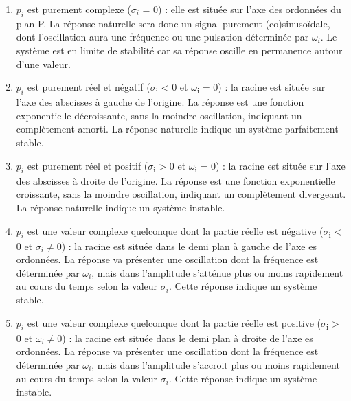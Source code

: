 \documentclass[]{book}
\begin{document}
{	
	\begin{enumerate}
		\item $p_{i}$ est purement complexe ($\sigma_{i}$ = 0) : elle est située sur l'axe des ordonnées du plan P. La réponse  naturelle sera donc un signal purement (co)sinusoïdale, dont l'oscillation aura une fréquence ou une pulsation déterminée par $\omega_{i}$. Le système est en limite de stabilité car sa réponse oscille en permanence autour d'une valeur.
		\item $p_{i}$ est purement réel et négatif ($ \sigma $\textsubscript{i} \textless{} 0 et 		$ \omega $\textsubscript{i} = 0) : la racine est située sur l'axe des abscisses à 		gauche de l'origine. La réponse est une fonction exponentielle 		décroissante, sans la moindre oscillation, indiquant un complètement 		amorti. La réponse naturelle indique un système parfaitement stable.
		\item $p_{i}$ est purement réel et positif ($ \sigma $\textsubscript{i} \textgreater{} 0 et $ \omega $\textsubscript{i} = 0) : la racine est située sur l'axe des abscisses à droite de l'origine. La réponse est une fonction exponentielle croissante, sans la moindre oscillation, indiquant un complètement divergeant. La réponse naturelle indique un système instable.
		\item $p_{i}$ est une valeur complexe quelconque dont la partie réelle est négative ($ \sigma $\textsubscript{i} \textless{} 0 et  $ \sigma_{i} \neq 0 $) : la racine 	est située dans le demi plan à gauche de l'axe es ordonnées. La réponse va présenter une oscillation dont la fréquence est déterminée par $ \omega_{i}$, mais dans l'amplitude s'atténue plus ou moins rapidement au cours du temps selon la valeur  $ \sigma_{i} $. Cette réponse indique un système stable.
		\item $p_{i}$ est une valeur complexe quelconque dont la partie réelle est positive ($ \sigma $\textsubscript{i} \textgreater{} 0 et $ \omega_{i} \neq 0 $) : la racine est située dans le demi plan à droite de l'axe es ordonnées. La réponse va présenter une oscillation dont la fréquence est déterminée par $ \omega_{i} $, mais dans l'amplitude s'accroit plus ou moins rapidement au cours du temps selon la valeur  $ \sigma_{i} $. Cette réponse indique	un système instable.
		

	\end{enumerate}
	
}
\end{document}
